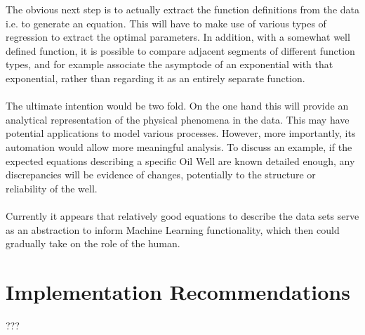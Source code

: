 \documentclass[main.tex]{subfiles}
\begin{document}
    The obvious next step is to actually extract the function definitions from the data i.e. to generate an equation. This will have to make use of various types of regression to extract the optimal parameters. In addition, with a somewhat well defined function, it is possible to compare adjacent segments of different function types, and for example associate the asymptode of an exponential with that exponential, rather than regarding it as an entirely separate function.
    \\\\
    The ultimate intention would be two fold. On the one hand this will provide an analytical representation of the physical phenomena in the data. This may have potential applications to model various processes. However, more importantly, its automation would allow more meaningful analysis. To discuss an example, if the expected equations describing a specific Oil Well are known detailed enough, any discrepancies will be evidence of changes, potentially to the structure or reliability of the well.
    \\\\
    Currently it appears that relatively good equations to describe the data sets serve as an abstraction to inform Machine Learning functionality, which then could gradually take on the role of the human.
    
  \section{Implementation Recommendations}
    
    ???
    
\end{document}

